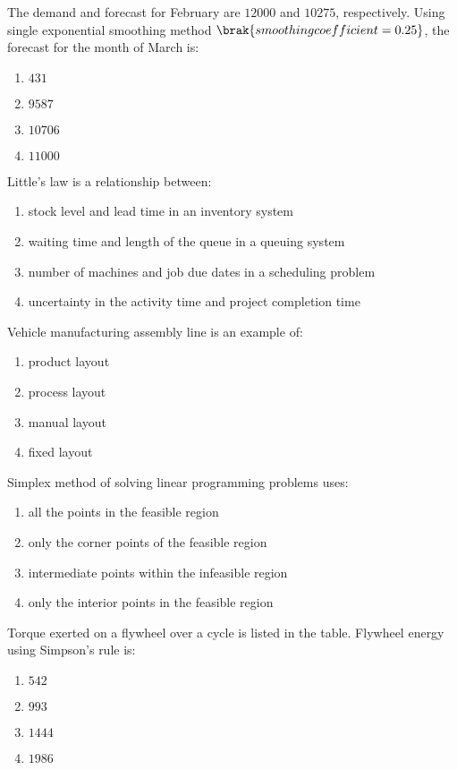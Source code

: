     \item The demand and forecast for February are $12000$ and $10275$, respectively. Using single exponential smoothing method $\brak{smoothing coefficient = 0.25}$, the forecast for the month of March is:
    \begin{enumerate}
        \item $431$
        \item $9587$
        \item $10706$
        \item $11000$
    \end{enumerate}

    \item Little's law is a relationship between:
    \begin{enumerate}
        \item stock level and lead time in an inventory system
        \item waiting time and length of the queue in a queuing system
        \item number of machines and job due dates in a scheduling problem
        \item uncertainty in the activity time and project completion time
    \end{enumerate}

    \item Vehicle manufacturing assembly line is an example of:
    \begin{enumerate}
        \item product layout
        \item process layout
        \item manual layout
        \item fixed layout
    \end{enumerate}

    \item Simplex method of solving linear programming problems uses:
    \begin{enumerate}
        \item all the points in the feasible region
        \item only the corner points of the feasible region
        \item intermediate points within the infeasible region
        \item only the interior points in the feasible region
    \end{enumerate}

    \item Torque exerted on a flywheel over a cycle is listed in the table. Flywheel energy  using Simpson's rule is:
   
    \begin{enumerate}
        \item $542$
        \item $993$
        \item $1444$
        \item $1986$
    \end{enumerate}
    


